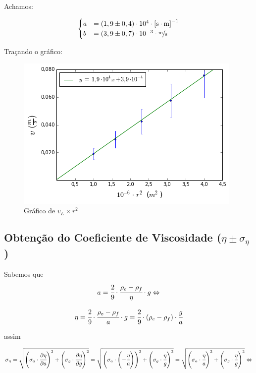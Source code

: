 \documentclass[english,brazil]{article}
\begin{document}
			Achamos:

			\[
				\begin{cases}
					a & =\left(1,9\pm0,4\right)\cdot10^{4}\cdot\unit{\left[s\cdot m\right]^{-1}}\\
					b & =\left(3,9\pm0,7\right)\cdot10^{-3}\cdot\unit{\unitfrac{m}{s}}
				\end{cases}
			\]
			
			Traçando o gráfico:
			\begin{figure}[!ht]
				\centering
					\includegraphics[scale=0.747]{exp05-vcorrigida.png}
				\caption{Gráfico de $v_{L}\times r^{2}$}
			\end{figure}


		\subsection{Obtenção do Coeficiente de Viscosidade ($\eta\pm\sigma_{\eta}$)}

			Sabemos que 
			$$a=\cfrac{2}{9}\cdot\cfrac{\rho_{e}-\rho_{f}}{\eta}\cdot g\Leftrightarrow$$
		
		\begin{equation}
			\eta=\cfrac{2}{9}\cdot\cfrac{\rho_{e}-\rho_{f}}{a}\cdot g=\cfrac{2}{9}\cdot\left(\rho_{e}-\rho_{f}\right)\cdot\cfrac{g}{a}
		\end{equation}

			assim 
			
			$$\sigma_{\eta}=\sqrt{\left(\sigma_{a}\cdot\cfrac{\partial\eta}{\partial a}\right)^{2}+\left(\sigma_{g}\cdot\cfrac{\partial\eta}{\partial g}\right)^{2}}=\sqrt{\left(\sigma_{a}\cdot\left(-\cfrac{\eta}{a}\right)\right)^{2}+\left(\sigma_{g}\cdot\cfrac{\eta}{g}\right)^{2}}=\sqrt{\left(\sigma_{a}\cdot\cfrac{\eta}{a}\right)^{2}+\left(\sigma_{g}\cdot\cfrac{\eta}{g}\right)^{2}} \Leftrightarrow$$
			
\end{document}
